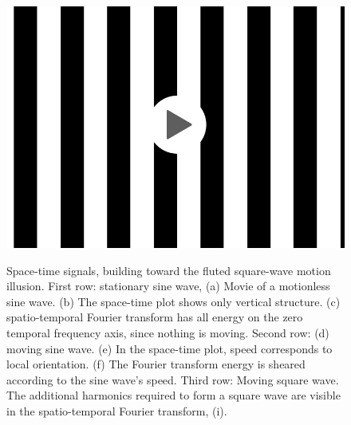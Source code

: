 \begin{figure}
{        \hspace{0.5}
    }
    \centerline{
        {
            \href{https://groups.csail.mit.edu/vision/cvbook/videos/movingSquareLoop.mov}{\includegraphics[width=0.2\linewidth]{figures/temporal_filters/movie3.jpg}}}
        \hspace{-0.8}
        \hspace{-0.1in}
    }
    \caption{Space-time signals, building toward the fluted square-wave motion illusion.    First row: stationary sine wave, (a) Movie of a motionless sine wave. (b) The space-time plot shows only vertical structure.
        (c) spatio-temporal Fourier transform has all energy on the zero temporal frequency axis, since nothing is moving.
        Second row:  (d) moving sine wave. (e) In the space-time plot, speed corresponds to local orientation. (f) The Fourier transform energy is sheared according to the sine wave's speed.
        Third row:  Moving square wave.  The additional harmonics required to form a square wave are visible in the spatio-temporal Fourier transform, (i).  }
    \label{fig:motionIllusion1}
\end{figure}

